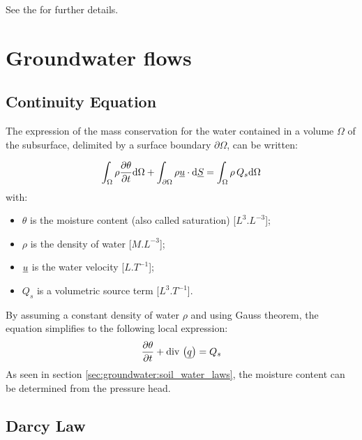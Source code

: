 See the  for further details.

\section{Groundwater flows}

\subsection{Continuity Equation}

The expression of the mass conservation for the water contained in a volume $\Omega$ of
the subsurface, delimited by a surface boundary $\partial \Omega$,
can be written:

\begin{equation}\label{eq:groundwater:int_mass_cons}
\int_\Omega{\rho \frac{\partial{\theta}}{\partial{t}} \mathrm{d}\Omega} + \int_{\partial \Omega}{ \rho \underline{u}\cdot  \mathrm{d} \underline{S}}=
\int_\Omega{\rho\,Q_s \mathrm{d}\Omega}
\end{equation}
with:
\begin {itemize}
 \item[$\bullet$] $\theta$ is the moisture content (also called saturation) [$L^3.L^{-3}$];
 \item[$\bullet$] $\rho$ is the density of water [$M.L^{-3}$];
 \item[$\bullet$] $\underline{u}$ is the water velocity [$L.T^{-1}$];
 \item[$\bullet$] $Q_s$ is a volumetric source term [$L^3.T^{-1}$].
\end{itemize}

By assuming a constant density of water $\rho$ and using Gauss theorem, the equation simplifies to the following local expression:
\begin{equation}\label{eq:groundwater:mass_cons}
\frac{\partial{\theta}}{\partial{t}} + \text{div}\, \left( \underline{q} \right) = Q_s
\end{equation}
As seen in section \ref{sec:groundwater:soil_water_laws}, the moisture content can be determined from the pressure head.

\subsection{Darcy Law}\label{sec:groundwater:darcy_law}


